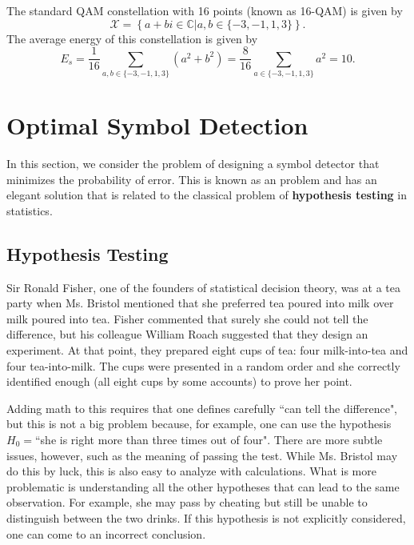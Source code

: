 \begin{example}
The standard QAM constellation with 16 points (known as 16-QAM) is given by
\[ \mathcal{X} = \left\{ a+bi \in \mathbb{C} \big| a,b \in \{-3,-1,1,3\} \right\}. \]
The average energy of this constellation is given by
\[ E_s = \frac{1}{16} \sum_{a,b\in \{-3,-1,1,3\}} (a^2 + b^2) = \frac{8}{16}  \sum_{a\in \{-3,-1,1,3\}} a^2 = 10.\]
\end{example}

\section{Optimal Symbol Detection}

In this section, we consider the problem of designing a symbol detector that minimizes the probability of error.
This is known as an  problem and has an elegant solution that is related to the classical problem of \textbf{hypothesis testing} in statistics.

\subsection{Hypothesis Testing}

Sir Ronald Fisher, one of the founders of statistical decision theory, was at a tea party when Ms. Bristol mentioned that she preferred tea poured into milk over milk poured into tea.
Fisher commented that surely she could not tell the difference, but his colleague William Roach suggested that they design an experiment.
At that point, they prepared eight cups of tea: four milk-into-tea and four tea-into-milk.
The cups were presented in a random order and she correctly identified enough (all eight cups by some accounts) to prove her point.

Adding math to this requires that one defines carefully ``can tell the difference", but this is not a big problem because, for example, one can use the hypothesis $H_0=$``she is right more than three times out of four".
There are more subtle issues, however, such as the meaning of passing the test.
While Ms. Bristol may do this by luck, this is also easy to analyze with calculations.
What is more problematic is understanding all the other hypotheses that can lead to the same observation.
For example, she may pass by cheating but still be unable to distinguish between the two drinks.
If this hypothesis is not explicitly considered, one can come to an incorrect conclusion.

